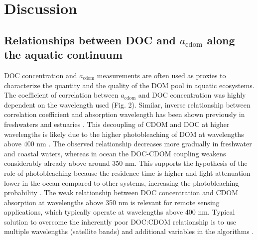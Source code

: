 
\section*{Discussion}
\label{sec:Discussion}

\subsection*{Relationships between DOC and $a_{\text{cdom}}$ along the aquatic continuum}

DOC concentration and $a_{\text{cdom}}$ measurements are often used as proxies to characterize the quantity and the quality of the DOM pool in aquatic ecosystems. The coefficient of correlation between $a_{\text{cdom}}$ and DOC concentration was highly dependent on the wavelength used (Fig. 2). Similar, inverse relationship between correlation coefficient and absorption wavelength has been shown previously in freshwaters and estuaries \citep{Asmala2012, Peacock2014}. This decoupling of CDOM and DOC at higher wavelengths is likely due to the higher photobleaching of DOM at wavelengths above 400 nm \citep{Osburn2009}. The observed relationship decreases more gradually in freshwater and coastal waters, whereas in ocean the DOC-CDOM coupling weakens considerably already above around 350 nm. This supports the hypothesis of the role of photobleaching because the residence time is higher and light attenuation lower in the ocean compared to other systems, increasing the photobleaching probability \citep{DelVecchio2002, Swan2012, Nelson2013}. The weak relationship between DOC concentration and CDOM absorption at wavelengths above 350 nm is relevant for remote sensing applications, which typically operate at wavelengths above 400 nm. Typical solution to overcome the inherently poor DOC:CDOM relationship is to use multiple wavelengths (satellite bands) and additional variables in the algorithms \citep{DelCastillo2008, Mannino2008}.

